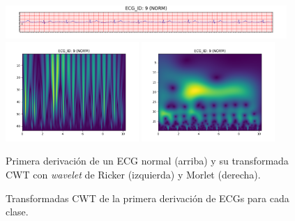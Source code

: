 \begin{figure}[t]
	\centering
	\includegraphics[width=0.95\textwidth]{Imagenes/Vectorial/Transformadas/NORM/ecg.png}
	\includegraphics[width=0.45\textwidth]{Imagenes/Vectorial/Transformadas/NORM/cwt_ricker.png}
	\includegraphics[width=0.45\textwidth]{Imagenes/Vectorial/Transformadas/NORM/cwt_morlet.png}
	\par Primera derivación de un ECG normal (arriba) y su transformada CWT con \emph{wavelet} de Ricker (izquierda) y Morlet (derecha).
	\caption{Transformadas CWT de la primera derivación de ECGs para cada clase.}
	\label{fig:cwt}
\end{figure}
